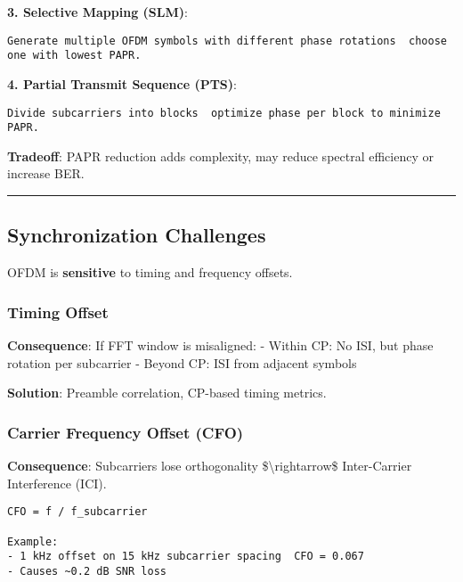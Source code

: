 \textbf{3. Selective Mapping (SLM)}:

\begin{verbatim}
Generate multiple OFDM symbols with different phase rotations  choose one with lowest PAPR.
\end{verbatim}

\textbf{4. Partial Transmit Sequence (PTS)}:

\begin{verbatim}
Divide subcarriers into blocks  optimize phase per block to minimize PAPR.
\end{verbatim}

\textbf{Tradeoff}: PAPR reduction adds complexity, may reduce spectral
efficiency or increase BER.

\begin{center}\rule{0.5\linewidth}{0.5pt}\end{center}

\subsection{\texorpdfstring{ Synchronization
Challenges}{ Synchronization Challenges}}\label{synchronization-challenges}

OFDM is \textbf{sensitive} to timing and frequency offsets.

\subsubsection{Timing Offset}\label{timing-offset}

\textbf{Consequence}: If FFT window is misaligned: - Within CP: No ISI,
but phase rotation per subcarrier - Beyond CP: ISI from adjacent symbols

\textbf{Solution}: Preamble correlation, CP-based timing metrics.

\subsubsection{Carrier Frequency Offset
(CFO)}\label{carrier-frequency-offset-cfo}

\textbf{Consequence}: Subcarriers lose orthogonality
\$\textbackslash rightarrow\$ Inter-Carrier Interference (ICI).

\begin{verbatim}
CFO = f / f_subcarrier

Example:
- 1 kHz offset on 15 kHz subcarrier spacing  CFO = 0.067
- Causes ~0.2 dB SNR loss
\end{verbatim}

